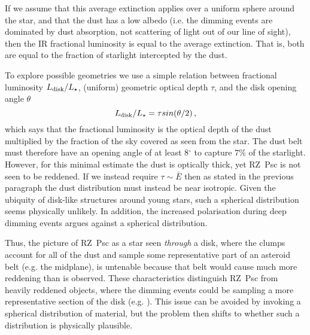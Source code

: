 \documentclass[]{rsos}
\begin{document}
If we assume that this average extinction applies over a uniform sphere around the star,
and that the dust has a low albedo (i.e. the dimming events are dominated by dust
absorption, not scattering of light out of our line of sight), then the IR fractional
luminosity is equal to the average extinction. That is, both are equal to the fraction of
starlight intercepted by the dust.

To explore possible geometries we use a simple relation between fractional luminosity
$L_{\rm disk}/L_\star$, (uniform) geometric optical depth $\tau$, and the disk opening
angle $\theta$ \cite{2014MNRAS.438.3299K}
\begin{equation}
  L_{\rm disk}/L_\star = \tau sin(\theta/2) \, ,
\end{equation}
which says that the fractional luminosity is the optical depth of the dust multiplied by
the fraction of the sky covered as seen from the star. The dust belt must therefore have
an opening angle of at least 8$^\circ$ to capture 7\% of the starlight. However, for this
minimal estimate the dust is optically thick, yet RZ~Psc is not seen to be reddened. If
we instead require $\tau \sim \bar{E}$ then as stated in the previous paragraph the dust
distribution must instead be near isotropic. Given the ubiquity of disk-like structures
around young stars, such a spherical distribution seems physically unlikely. In addition,
the increased polarisation during deep dimming events argues against a spherical
distribution.

Thus, the picture of RZ~Psc as a star seen \emph{through} a disk, where the clumps
account for all of the dust and sample some representative part of an asteroid belt
(e.g. the midplane), is untenable because that belt would cause much more reddening than
is observed. These characteristics distinguish RZ~Psc from heavily reddened objects,
where the dimming events could be sampling a more representative section of the disk
(e.g. \cite{2015MNRAS.451...26S}). This issue can be avoided by invoking a spherical
distribution of material, but the problem then shifts to whether such a distribution is
physically plausible.
\end{document}
